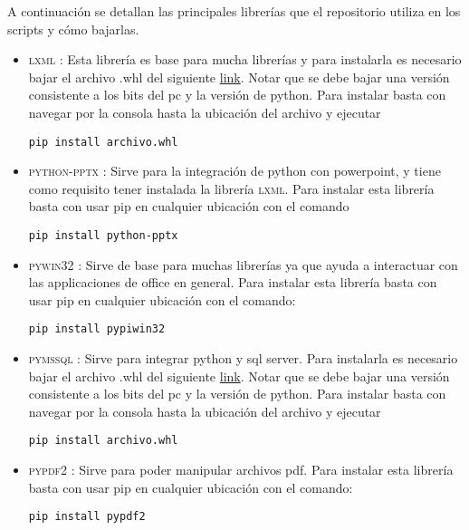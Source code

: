 \documentclass{article}
\begin{document}
A continuación se detallan las principales librerías que el repositorio utiliza en los scripts y cómo bajarlas.
\begin{itemize}
\item \textsc{lxml} : Esta librería es base para mucha librerías y para instalarla es necesario bajar el archivo .whl del siguiente \href{http://www.lfd.uci.edu/~gohlke/pythonlibs/#lxml}{link}. 
Notar que se debe bajar una versión consistente a los bits del pc y la versión de python. Para instalar basta con navegar por la consola hasta la ubicación del 
archivo y ejecutar 
\begin{center}
\texttt{pip install archivo.whl}
\end{center}

\item \textsc{python-pptx} : Sirve para la integración de python con powerpoint, y tiene como requisito tener instalada la librería \textsc{lxml}. Para instalar esta librería basta con usar pip en cualquier ubicación con el comando 
\begin{center}
\texttt{pip install python-pptx}
\end{center}

\item \textsc{pywin32} : Sirve de base para muchas librerías ya que ayuda a interactuar con las applicaciones de office en general. Para instalar esta librería basta con usar pip en cualquier ubicación con el comando:
\begin{center}
\texttt{pip install pypiwin32}
\end{center}

\item \textsc{pymssql} : Sirve para integrar python y sql server. Para instalarla es necesario bajar el archivo .whl del siguiente \href{http://www.lfd.uci.edu/~gohlke/pythonlibs/#pymssql}{link}. 
Notar que se debe bajar una versión consistente a los bits del pc y la versión de python. Para instalar basta con navegar por la consola hasta la ubicación del 
archivo y ejecutar 
\begin{center}
\texttt{pip install archivo.whl}
\end{center}


\item \textsc{pypdf2} : Sirve para poder manipular archivos pdf. Para instalar esta librería basta con usar pip en cualquier ubicación con el comando:
\begin{center}
\texttt{pip install pypdf2}
\end{center}



\end{itemize}
\end{document}
